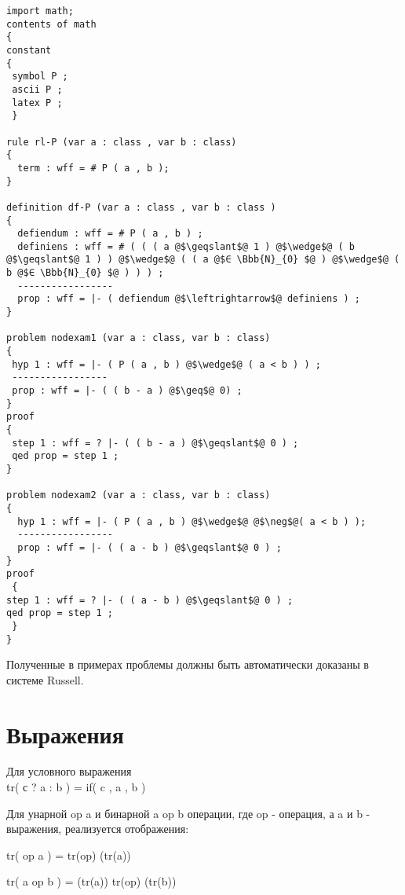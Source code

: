 \documentclass[10pt,a4paper]{article}
\begin{document}
\begin{flushleft}
\begin{lstlisting}
import math;
contents of math
{
constant
{
 symbol P ;
 ascii P ;
 latex P ;
 }

rule rl-P (var a : class , var b : class)
{
  term : wff = # P ( a , b );
}

definition df-P (var a : class , var b : class )
{
  defiendum : wff = # P ( a , b ) ;
  definiens : wff = # ( ( ( a @$\geqslant$@ 1 ) @$\wedge$@ ( b @$\geqslant$@ 1 ) ) @$\wedge$@ ( ( a @$∈ \Bbb{N}_{0} $@ ) @$\wedge$@ ( b @$∈ \Bbb{N}_{0} $@ ) ) ) ;
  -----------------
  prop : wff = |- ( defiendum @$\leftrightarrow$@ definiens ) ;
}

problem nodexam1 (var a : class, var b : class)
{
 hyp 1 : wff = |- ( P ( a , b ) @$\wedge$@ ( a < b ) ) ;
 -----------------
 prop : wff = |- ( ( b - a ) @$\geq$@ 0) ;
}
proof
{
 step 1 : wff = ? |- ( ( b - a ) @$\geqslant$@ 0 ) ;
 qed prop = step 1 ;
}

problem nodexam2 (var a : class, var b : class)
{
  hyp 1 : wff = |- ( P ( a , b ) @$\wedge$@ @$\neg$@( a < b ) );
  -----------------
  prop : wff = |- ( ( a - b ) @$\geqslant$@ 0 ) ;
}
proof
 {
step 1 : wff = ? |- ( ( a - b ) @$\geqslant$@ 0 ) ;
qed prop = step 1 ;
 }
}
\end{lstlisting}
\end{flushleft}

\begin{flushleft}
Полученные в примерах проблемы должны быть автоматически доказаны в системе Russell.
\end{flushleft}

\section{Выражения}

\begin{flushleft}
Для условного выражения
\\
tr( с ? a : b )  =  \rm{if}( c , a , b )
\end{flushleft}
\begin{flushleft}
Для унарной op a и бинарной a op b операции, где op - операция, а a и b  -  выражения, реализуется отображения:
\end{flushleft}


\begin{flushleft}
tr( op a )  =  tr(op) (tr(a))

tr( a op b )  =  (tr(a)) tr(op) (tr(b))
\end{flushleft}
\end{document}
